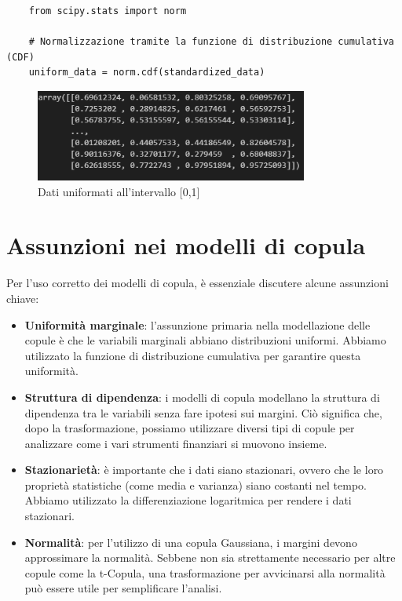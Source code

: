 \documentclass[%
	corpo=11pt,
    twoside,
    stile=classica,
    oldstyle,
    tipotesi=custom,
    greek,
    evenboxes,
]{toptesi}
\begin{document}
\begin{verbatim}
	from scipy.stats import norm
	
	# Normalizzazione tramite la funzione di distribuzione cumulativa (CDF)
	uniform_data = norm.cdf(standardized_data)
\end{verbatim}

\begin{figure}[h]
	\centering
	\includegraphics[width=0.8\textwidth]{./Pictures/norm.png}
	\caption{Dati uniformati all’intervallo [0,1]}
	\label{fig:uniform_data}
\end{figure}

\section{Assunzioni nei modelli di copula}

Per l’uso corretto dei modelli di copula, è essenziale discutere alcune assunzioni chiave:

\begin{itemize}
	\item \textbf{Uniformità marginale}: l’assunzione primaria nella modellazione delle copule è che le variabili marginali abbiano distribuzioni uniformi. Abbiamo utilizzato la funzione di distribuzione cumulativa per garantire questa uniformità.
	
	\item \textbf{Struttura di dipendenza}: i modelli di copula modellano la struttura di dipendenza tra le variabili senza fare ipotesi sui margini. Ciò significa che, dopo la trasformazione, possiamo utilizzare diversi tipi di copule per analizzare come i vari strumenti finanziari si muovono insieme.
	
	\item \textbf{Stazionarietà}: è importante che i dati siano stazionari, ovvero che le loro proprietà statistiche (come media e varianza) siano costanti nel tempo. Abbiamo utilizzato la differenziazione logaritmica per rendere i dati stazionari.
	
	\item \textbf{Normalità}: per l’utilizzo di una copula Gaussiana, i margini devono approssimare la normalità. Sebbene non sia strettamente necessario per altre copule come la t-Copula, una trasformazione per avvicinarsi alla normalità può essere utile per semplificare l’analisi.
\end{itemize}
\end{document}
